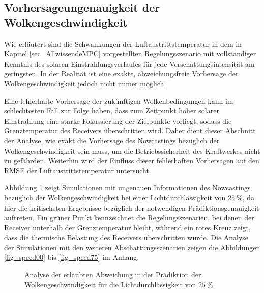 \subsection{Vorhersageungenauigkeit der Wolkengeschwindigkeit} \label{subsec_speedpräd}
Wie erläutert sind die Schwankungen der Luftaustrittstemperatur in dem in Kapitel \ref{sec_AllwissendeMPC} vorgestellten Regelungsszenario mit vollständiger Kenntnis des solaren Einstrahlungsverlaufes für jede Verschattungsintensität am geringsten.
In der Realität ist eine exakte, abweichungsfreie Vorhersage der Wolkengeschwindigkeit jedoch nicht immer möglich.

Eine fehlerhafte Vorhersage der zukünftigen Wolkenbedingungen kann im schlechtesten Fall zur Folge haben, dass zum Zeitpunkt hoher solarer Einstrahlung eine starke Fokussierung der Zielpunkte vorliegt, sodass die Grenztemperatur des Receivers überschritten wird.
Daher dient dieser Abschnitt der Analyse, wie exakt die Vorhersage des Nowcastings bezüglich der Wolkengeschwindigkeit sein muss, um die Betriebssicherheit des Kraftwerkes nicht zu gefährden.
Weiterhin wird der Einfluss dieser fehlerhaften Vorhersagen auf den RMSE der Luftaustrittstemperatur untersucht.

Abbildung \ref{fig_speed25} zeigt Simulationen mit ungenauen Informationen des Nowcastings bezüglich der Wolkengeschwindigkeit bei einer Lichtdurchlässigkeit von $\SI{25}{\percent}$, da hier die kritischsten Ergebnisse bezüglich der notwendigen Prädiktionsgenauigkeit auftreten.
Ein grüner Punkt kennzeichnet die Regelungsszenarien, bei denen der Receiver unterhalb der Grenztemperatur bleibt, während ein rotes Kreuz zeigt, dass die thermische Belastung des Receivers überschritten wurde.
Die Analyse der Simulationen mit den weiteren Abschattungsszenarien zeigen die Abbildungen \ref{fig_speed00} bis \ref{fig_speed75} im Anhang.

\begin{figure}[h!]
    \centering
    \setlength{\fboxsep}{1pt}
    \setlength{\fboxrule}{1pt}
    \caption[Analyse der erlaubten Abweichung in der Prädiktion der Wolkengeschwindigkeit für die Lichtdurchlässigkeit von $\SI{25}{\percent}$]{Analyse der erlaubten Abweichung in der Prädiktion der Wolkengeschwindigkeit für die Lichtdurchlässigkeit von $\SI{25}{\percent}$}
    \label{fig_speed25}
\end{figure}

